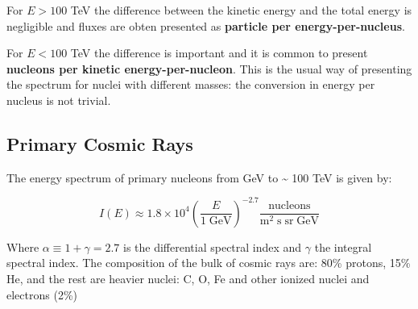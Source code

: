 \documentclass[
  letterpaper,
  DIV=11,
  numbers=noendperiod]{scrreprt}
\begin{document}
For \(E > 100\) TeV the difference between the kinetic energy and the
total energy is negligible and fluxes are obten presented as
\textbf{particle per energy-per-nucleus}.

For \(E < 100\) TeV the difference is important and it is common to
present \textbf{nucleons per kinetic energy-per-nucleon}. This is the
usual way of presenting the spectrum for nuclei with different masses:
the conversion in energy per nucleus is not trivial.

\subsection{Primary Cosmic Rays}\label{primary-cosmic-rays}

The energy spectrum of primary nucleons from GeV to \textasciitilde{}
100 TeV is given by:

\[I(E) \approx 1.8 \times 10^4 \left(\frac{E}{1\; \mathrm{GeV}}\right)^{-2.7} \frac{\mathrm{nucleons}}{\mathrm{m}^2\; \mathrm{s\;sr\;GeV}}\]

Where \(\alpha \equiv 1+ \gamma = 2.7\) is the differential spectral
index and \(\gamma\) the integral spectral index. The composition of the
bulk of cosmic rays are: 80\% protons, 15\% He, and the rest are heavier
nuclei: C, O, Fe and other ionized nuclei and electrons (2\%)
\end{document}
